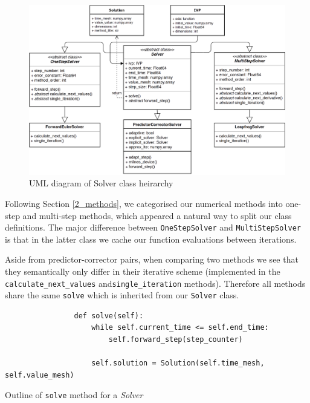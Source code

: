 \documentclass[12pt, twoside]{report}
\theoremstyle{plain}
\theoremstyle{definition}
\theoremstyle{definition}
\begin{document}
        \begin{figure}[H]
            \centering
                \includegraphics[width=0.9\columnwidth]{uml_diagram}
                \caption{UML diagram of Solver class heirarchy}
                \label{3_uml}
        \end{figure}

        Following Section \ref{2_methods}, we categorised our numerical
        methods into one-step and multi-step methods, which appeared a natural 
        way to split our class definitions. The major difference between
        \texttt{OneStepSolver} and 
        \texttt{MultiStepSolver} is that in the latter class we 
        cache our function evaluations between iterations. 

        Aside from predictor-corrector pairs, when comparing two methods we 
        see that they semantically only differ in their iterative scheme 
        (implemented in the \texttt{calculate_next_values} 
        and\linebreak \texttt{single_iteration} methods). 
        Therefore all methods share the same \texttt{solve} which 
        is inherited from our \texttt{Solver} class. 

        \begin{listing}[H]
            \begin{verbatim}
                def solve(self):
                    while self.current_time <= self.end_time:
                        self.forward_step(step_counter)

                    self.solution = Solution(self.time_mesh, self.value_mesh)
            \end{verbatim}
            \caption{
            Outline of \texttt{solve} method for a \textit{Solver}}
            \label{3_solve}
        \end{listing}
        
\end{document}
